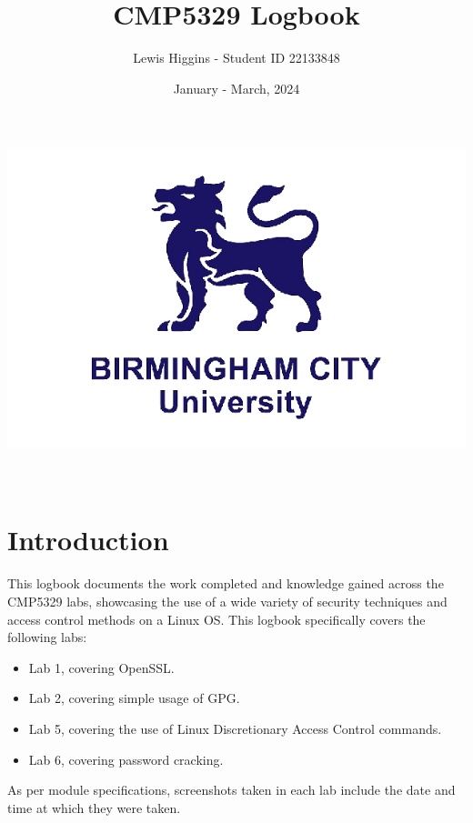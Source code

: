 \documentclass[12pt]{report}
\title{CMP5329 Logbook}
\author{Lewis Higgins - Student ID 22133848}
\date{January - March, 2024}
\begin{document}
    \makeatletter
    \begin{titlepage}
        \begin{center}
            \includegraphics[width=0.7\linewidth]{bcu logo}\\[4ex]
            {\huge \bfseries  \@title }\\[2ex]
            {\@author}\\[50ex]
            {\large \@date}
        \end{center}
    \end{titlepage}
    \makeatother
    \thispagestyle{empty}
    \newpage

    \tableofcontents

    \chapter*{Introduction}\label{ch:introduction}

    This logbook documents the work completed and knowledge gained across the CMP5329 labs, showcasing
    the use of a wide variety of security techniques and access control methods on a Linux OS\@.
    This logbook specifically covers the following labs:
    \begin{itemize}
        \item Lab 1, covering OpenSSL\@.
        \item Lab 2, covering simple usage of GPG\@.
        \item Lab 5, covering the use of Linux Discretionary Access Control commands.
        \item Lab 6, covering password cracking.
    \end{itemize}

    \noindent As per module specifications, screenshots taken in each lab
    include the date and time at which they were taken.\\
\end{document}

